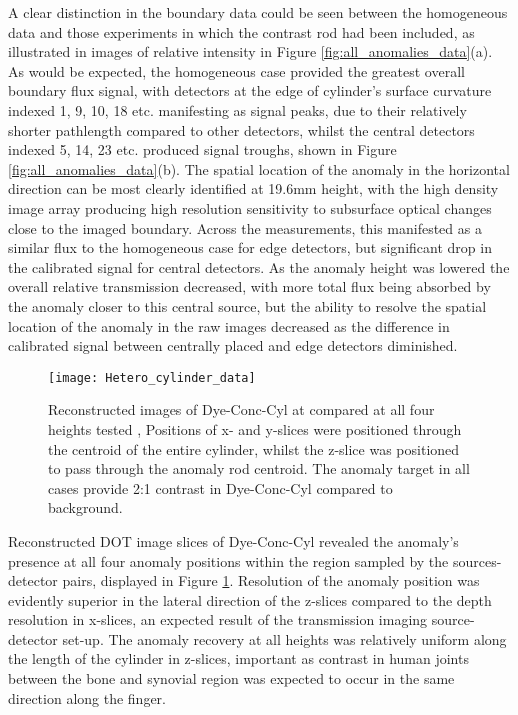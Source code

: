 \documentclass[twoside]{bhamthesis}
\theoremstyle{definition}
\begin{document}
A clear distinction in the boundary data could be seen between the homogeneous data and those experiments in which the contrast rod had been included, as illustrated in images of relative intensity in Figure \ref{fig:all_anomalies_data}(a). As would be expected, the homogeneous case provided the greatest overall boundary flux signal, with detectors at the edge of cylinder's surface curvature indexed 1, 9, 10, 18 etc. manifesting as signal peaks, due to their relatively shorter pathlength compared to other detectors, whilst the central detectors indexed 5, 14, 23 etc. produced signal troughs, shown in Figure \ref{fig:all_anomalies_data}(b). The spatial location of the anomaly in the horizontal direction can be most clearly identified at 19.6mm height, with the high density image array producing high resolution sensitivity to subsurface optical changes close to the imaged boundary. Across the measurements, this manifested as a similar flux to the homogeneous case for edge detectors, but significant drop in the calibrated signal for central detectors. As the anomaly height was lowered the overall relative transmission decreased, with more total flux being absorbed by the anomaly closer to this central source, but the ability to resolve the spatial location of the anomaly in the raw images decreased as the difference in calibrated signal between centrally placed and edge detectors diminished.
 
\begin{landscape}

\begin{figure}[!ht]
\centering
  \texttt{[image: Hetero\_cylinder\_data]}
  \caption{Reconstructed images of Dye-Conc-Cyl at compared at all four heights tested , Positions of x- and y-slices were positioned through the centroid of the entire cylinder, whilst the z-slice was positioned to pass through the anomaly rod centroid. The anomaly target in all cases provide 2:1 contrast in Dye-Conc-Cyl compared to background.}
  \label{fig:Hetero_cylinder_data}
\end{figure}

\end{landscape}

Reconstructed DOT image slices of Dye-Conc-Cyl revealed the anomaly's presence at all four anomaly positions within the region sampled by the sources-detector pairs, displayed in Figure \ref{fig:Hetero_cylinder_data}. Resolution of the anomaly position was evidently superior in the lateral direction of the z-slices compared to the depth resolution in x-slices, an expected result of the transmission imaging source-detector set-up. The anomaly recovery at all heights was relatively uniform along the length of the cylinder in z-slices, important as contrast in human joints between the bone and synovial region was expected to occur in the same direction along the finger. 
\end{document}
